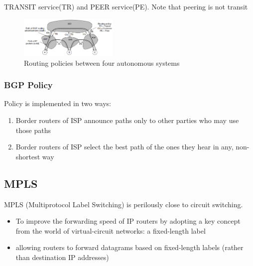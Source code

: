 TRANSIT service(TR) and PEER service(PE). Note that peering is not transit 

\begin{figure}[!htb]
    \centering
    \includegraphics[width=0.42\textwidth]{pic/CN5/Routing policies between four autonomous systems}
    \caption{Routing policies between four autonomous systems}
\end{figure}

\subsubsection{BGP Policy}
Policy is implemented in two ways:
\begin{enumerate}
    \item Border routers of ISP announce paths only to other
    parties who may use those paths
    \item Border routers of ISP select the best path of the ones they
    hear in any, non-shortest way
\end{enumerate}

\subsection{MPLS}
MPLS (Multiprotocol Label Switching) is perilously close to circuit switching. 
\begin{itemize}
    \item To improve the forwarding speed of IP routers by adopting a key
    concept from the world of virtual-circuit networks: a fixed-length
    label
    \item allowing routers to forward datagrams based on fixed-length
    labels (rather than destination IP addresses)
\end{itemize}

